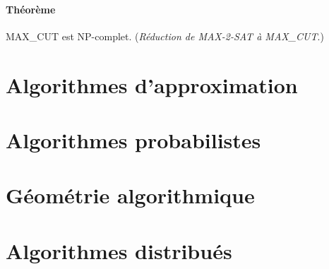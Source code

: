 \documentclass[french]{article}
\begin{document}
\paragraph{Théorème} MAX\_CUT est NP-complet. (\emph{Réduction de MAX-2-SAT à MAX\_CUT}.)

\section{Algorithmes d'approximation}

\section{Algorithmes probabilistes}

\section{Géométrie algorithmique}

\section{Algorithmes distribués}
\end{document}
